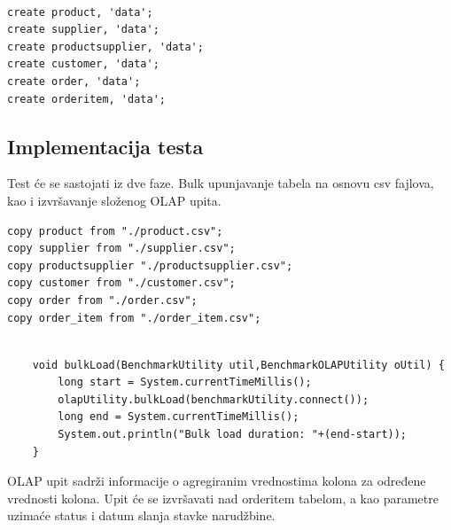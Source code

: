 \documentclass[12pt,oneside]{memoir}
\begin{document}
\begin{lstlisting}[title={hbase-setup-model},captionpos=t]

create product, 'data';
create supplier, 'data';
create productsupplier, 'data';
create customer, 'data';
create order, 'data';
create orderitem, 'data';

\end{lstlisting}

\subsection{Implementacija testa}

Test će se sastojati iz dve faze. Bulk upunjavanje tabela na osnovu csv fajlova, kao i izvršavanje složenog OLAP upita. 

\begin{lstlisting}[title={bulkLoad},captionpos=t]
copy product from "./product.csv";
copy supplier from "./supplier.csv";
copy productsupplier "./productsupplier.csv";
copy customer from "./customer.csv";
copy order from "./order.csv";
copy order_item from "./order_item.csv";
\end{lstlisting}


\begin{lstlisting}[title={BenchmarkExecutor.java},captionpos=t]

    void bulkLoad(BenchmarkUtility util,BenchmarkOLAPUtility oUtil) {
        long start = System.currentTimeMillis();
        olapUtility.bulkLoad(benchmarkUtility.connect());
        long end = System.currentTimeMillis();
        System.out.println("Bulk load duration: "+(end-start));
    }
\end{lstlisting}


OLAP upit sadrži informacije o agregiranim vrednostima kolona za određene vrednosti kolona. Upit će se izvršavati nad orderitem tabelom, a kao parametre uzimaće status i datum slanja stavke narudžbine.

\end{document}
